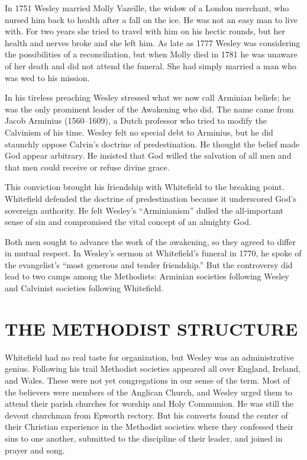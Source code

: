 In 1751 Wesley married Molly Vazeille, the widow of a London merchant, who nursed him back to health
after a fall on the ice. He was not an easy man to live with. For two years she tried to travel with
him on his hectic rounds, but her health and nerves broke and she left him. As late as 1777 Wesley
was considering the possibilities of a reconciliation, but when Molly died in 1781 he was unaware of
her death and did not attend the funeral. She had simply married a man who was wed to his mission.

In his tireless preaching Wesley stressed what we now call Arminian beliefs; he was the only
prominent leader of the Awakening who did. The name came from Jacob Arminius (1560–1609), a Dutch
professor who tried to modify the Calvinism of his time. Wesley felt no special debt to Arminius,
but he did staunchly oppose Calvin’s doctrine of predestination. He thought the belief made God
appear arbitrary. He insisted that God willed the salvation of all men and that men could receive or
refuse divine grace.

This conviction brought his friendship with Whitefield to the breaking point. Whitefield defended
the doctrine of predestination because it underscored God’s sovereign authority. He felt Wesley’s
“Arminianism” dulled the all-important sense of sin and compromised the vital concept of an almighty
God.

Both men sought to advance the work of the awakening, so they agreed to differ in mutual respect. In
Wesley’s sermon at Whitefield’s funeral in 1770, he spoke of the evangelist’s “most generous and
tender friendship.” But the controversy did lead to two camps among the Methodists: Arminian
societies following Wesley and Calvinist societies following Whitefield.

\section{THE METHODIST STRUCTURE}

Whitefield had no real taste for organization, but Wesley was an administrative genius. Following
his trail Methodist societies appeared all over England, Ireland, and Wales. These were not yet
congregations in our sense of the term. Most of the believers were members of the Anglican Church,
and Wesley urged them to attend their parish churches for worship and Holy Communion. He was still
the devout churchman from Epworth rectory. But his converts found the center of their Christian
experience in the Methodist societies where they confessed their sins to one another, submitted to
the discipline of their leader, and joined in prayer and song.

